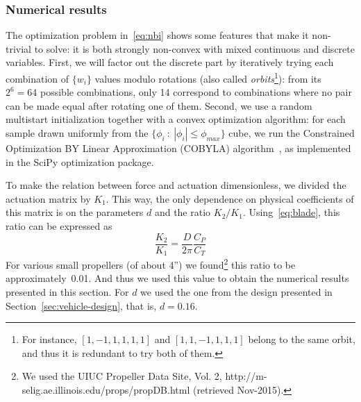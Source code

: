 \documentclass[review]{elsarticle}
\begin{document}

\subsubsection{Numerical results}
\label{sec:numerical-results}

The optimization problem in~\eqref{eq:nbi} shows some features that
make it non-trivial to solve: it is both strongly non-convex with
mixed continuous and discrete variables. First, we will factor out the
discrete part by iteratively trying each combination of $\{w_i\}$
values modulo rotations (also called \emph{orbits}\footnote{For
  instance, $[1,-1,1,1,1,1]$ and $[1,1,-1,1,1,1]$ belong to the same
  orbit, and thus it is redundant to try both of them.}): from its
$2^6=64$ possible combinations, only 14 correspond to combinations
where no pair can be made equal after rotating one of them. Second, we
use a random multistart initialization together with a convex
optimization algorithm: for each sample drawn uniformly from the
$\{\phi_i\::\:|\phi_i| \leq \phi_{max}\}$ cube, we run the Constrained
Optimization BY Linear Approximation (COBYLA) algorithm~\cite{powell94},
as implemented in the SciPy optimization package.


To make the relation between force and actuation dimensionless, we
divided the actuation matrix by $K_1$. This way, the only dependence
on physical coefficients of this matrix is on the parameters $d$ and
the ratio $K_2/K_1$. Using~\eqref{eq:blade}, this ratio can be
expressed as
\begin{equation}
  \frac{K_2}{K_1} = \frac{D}{2\pi} \frac{C_P}{C_T}
\end{equation}
For various small propellers (of about 4'') we found\footnote{We used the
  UIUC Propeller Data Site, Vol. 2,
  http://m-selig.ae.illinois.edu/props/propDB.html (retrieved
  Nov-2015).} this ratio to be approximately~0.01. And thus we used
this value to obtain the numerical results presented in this section.
For $d$ we used the one from the design presented in
Section~\ref{sec:vehicle-design}, that is, $d=0.16$.
\end{document}
